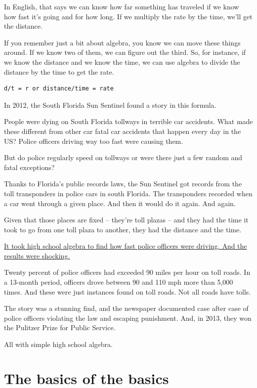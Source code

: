 \documentclass[
]{book}
\begin{document}
In English, that says we can know how far something has traveled if we know how fast it's going and for how long. If we multiply the rate by the time, we'll get the distance.

If you remember just a bit about algebra, you know we can move these things around. If we know two of them, we can figure out the third. So, for instance, if we know the distance and we know the time, we can use algebra to divide the distance by the time to get the rate.

\begin{verbatim}
d/t = r or distance/time = rate
\end{verbatim}

In 2012, the South Florida Sun Sentinel found a story in this formula.

People were dying on South Florida tollways in terrible car accidents. What made these different from other car fatal car accidents that happen every day in the US? Police officers driving way too fast were causing them.

But do police regularly speed on tollways or were there just a few random and fatal exceptions?

Thanks to Florida's public records laws, the Sun Sentinel got records from the toll transponders in police cars in south Florida. The transponders recorded when a car went through a given place. And then it would do it again. And again.

Given that those places are fixed -- they're toll plazas -- and they had the time it took to go from one toll plaza to another, they had the distance and the time.

\href{http://www.sun-sentinel.com/news/local/speeding-cops/fl-speeding-cops-20120211,0,3706919.story}{It took high school algebra to find how fast police officers were driving. And the results were shocking.}

Twenty percent of police officers had exceeded 90 miles per hour on toll roads. In a 13-month period, officers drove between 90 and 110 mph more than 5,000 times. And these were just instances found on toll roads. Not all roads have tolls.

The story was a stunning find, and the newspaper documented case after case of police officers violating the law and escaping punishment. And, in 2013, they won the Pulitzer Prize for Public Service.

All with simple high school algebra.

\hypertarget{the-basics-of-the-basics}{%
\section{The basics of the basics}\label{the-basics-of-the-basics}}
\end{document}
